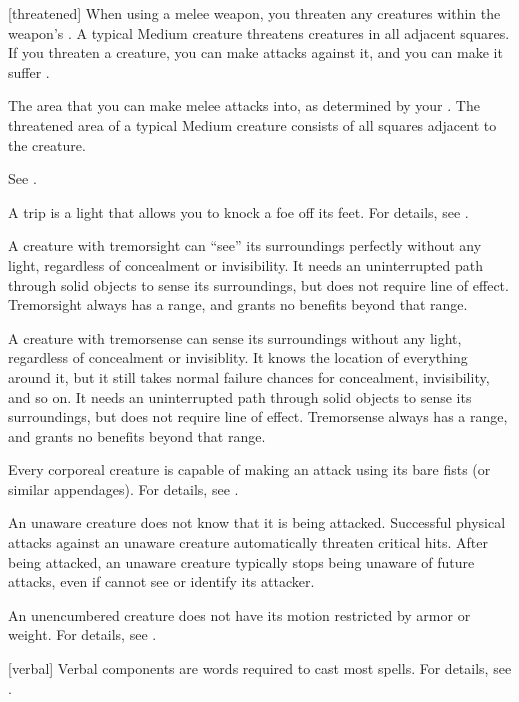 [threatened] When using a melee weapon, you threaten any creatures within the weapon's .
A typical Medium creature threatens creatures in all adjacent squares.
If you threaten a creature, you can make  attacks against it, and you can make it suffer .

 The area that you can make melee attacks into, as determined by your .
The threatened area of a typical Medium creature consists of all squares adjacent to the creature.

 See .

 A trip is a light  that allows you to knock a foe off its feet.
For details, see .

 A creature with tremorsight can ``see'' its surroundings perfectly without any light, regardless of concealment or invisibility.
It needs an uninterrupted path through solid objects to sense its surroundings, but does not require line of effect.
Tremorsight always has a range, and grants no benefits beyond that range.

 A creature with tremorsense can sense its surroundings without any light, regardless of concealment or invisiblity.
It knows the location of everything around it, but it still takes normal failure chances for concealment, invisibility, and so on.
It needs an uninterrupted path through solid objects to sense its surroundings, but does not require line of effect.
Tremorsense always has a range, and grants no benefits beyond that range.

 Every corporeal creature is capable of making an attack using its bare fists (or similar appendages).
For details, see .

 An unaware creature does not know that it is being attacked. Successful physical attacks against an unaware creature automatically threaten critical hits. After being attacked, an unaware creature typically stops being unaware of future attacks, even if cannot see or identify its attacker.

 An unencumbered creature does not have its motion restricted by armor or weight. For details, see .

[verbal] Verbal components are words required to cast most spells.
For details, see .

